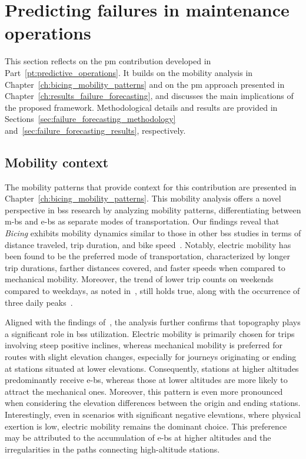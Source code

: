 \section{Predicting failures in maintenance operations}
\label{sec:disc_maintenance}

This section reflects on the \ac{pm} contribution developed in Part~\ref{pt:predictive_operations}. It builds on the mobility analysis in Chapter~\ref{ch:bicing_mobility_patterns} and on the \ac{pm} approach presented in Chapter~\ref{ch:results_failure_forecasting}, and discusses the main implications of the proposed framework. Methodological details and results are provided in Sections~\ref{sec:failure_forecasting_methodology} and~\ref{sec:failure_forecasting_results}, respectively.

\subsection{Mobility context}

The mobility patterns that provide context for this contribution are presented in Chapter~\ref{ch:bicing_mobility_patterns}. This mobility analysis offers a novel perspective in \ac{bss} research by analyzing mobility patterns, differentiating between \acp{m-b} and \acp{e-b} as separate modes of transportation. Our findings reveal that \textit{Bicing} exhibits mobility dynamics similar to those in other \ac{bss} studies in terms of distance traveled, trip duration, and bike speed~\cite{Jensen2010, Ciancia2015, Zaltz2013, Chiariotti2018, Borgnat2011, Zhang2016Bicycle}. Notably, electric mobility has been found to be the preferred mode of transportation, characterized by longer trip durations, farther distances covered, and faster speeds when compared to mechanical mobility. Moreover, the trend of lower trip counts on weekends compared to weekdays, as noted in~\cite{Froehlich2009, Bustamante2022}, still holds true, along with the occurrence of three daily peaks~\cite{Froehlich2009}. 

Aligned with the findings of~\cite{Morency2015, Kim2020}, the analysis further confirms that topography plays a significant role in \ac{bss} utilization. Electric mobility is primarily chosen for trips involving steep positive inclines, whereas mechanical mobility is preferred for routes with slight elevation changes, especially for journeys originating or ending at stations situated at lower elevations. Consequently, stations at higher altitudes predominantly receive \acp{e-b}, whereas those at lower altitudes are more likely to attract the mechanical ones. Moreover, this pattern is even more pronounced when considering the elevation differences between the origin and ending stations. Interestingly, even in scenarios with significant negative elevations, where physical exertion is low, electric mobility remains the dominant choice. This preference may be attributed to the accumulation of \acp{e-b} at higher altitudes and the irregularities in the paths connecting high-altitude stations.


